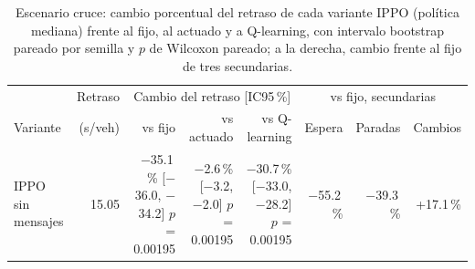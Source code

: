 \begin{table}[H]
\centering
\scriptsize
\setlength{\tabcolsep}{3pt}
\begin{tabular}{lrrrrrrr}
\toprule
 & Retraso & \multicolumn{3}{c}{Cambio del retraso [IC95\,\%]} & \multicolumn{3}{c}{vs fijo, secundarias} \\
\cmidrule(lr){3-5}\cmidrule(lr){6-8}
Variante & (s/veh) & vs fijo & vs actuado & vs Q-learning & Espera & Paradas & Cambios \\
\midrule
IPPO sin mensajes & 15.05 & \makecell[r]{$-$35.1\,\%\\{}[$-$36.0, $-$34.2]\\$p$ = 0.00195} & \makecell[r]{$-$2.6\,\%\\{}[$-$3.2, $-$2.0]\\$p$ = 0.00195} & \makecell[r]{$-$30.7\,\%\\{}[$-$33.0, $-$28.2]\\$p$ = 0.00195} & $-$55.2\,\% & $-$39.3\,\% & +17.1\,\% \\
\bottomrule
\end{tabular}
\caption[Escenario cruce: cambio del retraso de las variantes IPPO]{Escenario cruce: cambio porcentual del retraso de cada variante IPPO (política mediana) frente al fijo, al actuado y a Q-learning, con intervalo bootstrap pareado por semilla y $p$ de Wilcoxon pareado; a la derecha, cambio frente al fijo de tres secundarias.}
\label{tab:cruce-u4-deltas}
\end{table}
